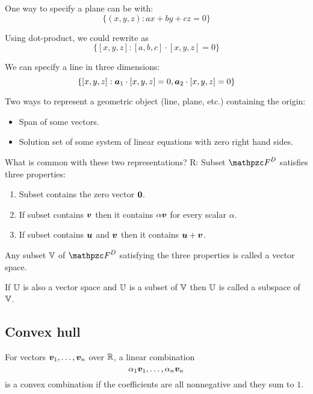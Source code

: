 One way to specify a plane can be with:
\begin{equation*}
  \{ (x, y, z) : ax + by + cz = 0 \}
\end{equation*}

Using dot-product, we could rewrite as
\begin{equation*}
  \{ [x, y, z] : [a, b, c] \cdot [x, y, z] = 0 \}
\end{equation*}

We can specify a line in three dimensions:
\begin{equation*}
  \{ [x, y, z] : {\bm{a}}_1 \cdot [x, y, z] = 0, {\bm{a}}_2 \cdot [x, y, z] = 0 \}
\end{equation*}

Two ways to represent a geometric object (line, plane, etc.) containing the origin:
\begin{itemize}
\item Span of some vectors.
\item Solution set of some system of linear equations with zero right hand sides.
\end{itemize}

What is common with these two representations? R: Subset $\fF^D$ satisfies three properties:
\begin{enumerate}
\item Subset contains the zero vector ${\bm{0}}$.
\item If subset contains ${\bm{v}}$ then it contains $\alpha{\bm{v}}$ for every scalar $\alpha$.
\item If subset contains ${\bm{u}}$ and ${\bm{v}}$ then it contains ${\bm{u}} + {\bm{v}}$.
\end{enumerate}

\begin{definition}
  Any subset ${\mathbb{V}}$ of $\fF^{D}$ satisfying the three properties is called a vector space.
\end{definition}

\begin{definition}
  If ${\mathbb{U}}$ is also a vector space and ${\mathbb{U}}$ is a subset of ${\mathbb{V}}$ then ${\mathbb{U}}$ is called a subspace of ${\mathbb{V}}$.
\end{definition}

\subsection{Convex hull}
\begin{definition}
  For vectors ${\bm{v}}_1, \ldots, {\bm{v}}_n$ over $\mathbb{R}$, a linear combination
  \begin{equation*}
    \alpha_1{\bm{v}}_1, \ldots, \alpha_n{\bm{v}}_n
  \end{equation*}
  is a convex combination if the coefficients are all nonnegative and they sum to $1$.
\end{definition}

